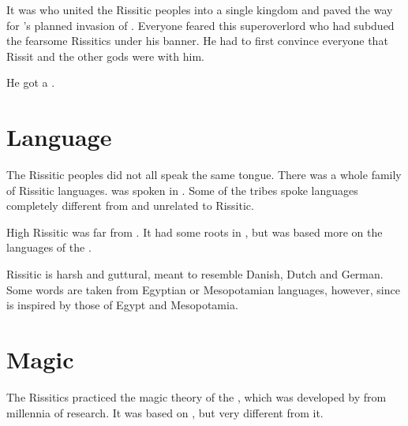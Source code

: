 It was  who united the Rissitic peoples into a single kingdom and paved the way for \Secherdamon's planned invasion of \Velcad.
Everyone feared this super\human overlord who had subdued the fearsome Rissitics under his banner. 
He had to first convince everyone that Rissit and the other gods were with him.

He got a . 

















\section{Language}
The Rissitic peoples did not all speak the same tongue.
There was a whole family of Rissitic languages. 
 was spoken in \Durcac.
Some of the tribes spoke languages completely different from and unrelated to Rissitic.

High Rissitic was far from \Ortaican. 
It had some roots in \Ortaican, but was based more on the languages of the . 

Rissitic is harsh and guttural, meant to resemble Danish, Dutch and German. 
Some words are taken from Egyptian or Mesopotamian languages, however, since  is inspired by those of Egypt and Mesopotamia. 















\section{Magic}
The Rissitics practiced the magic theory of the , which was developed by \RissitNechsain{} from millennia of research. 
It was based on , but very different from it.

